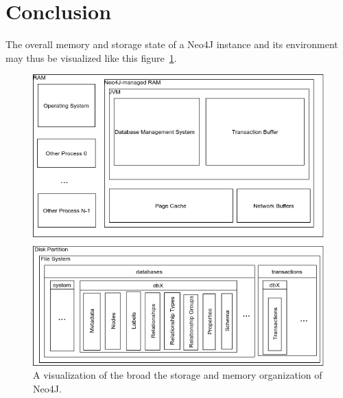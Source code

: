 \documentclass[a4paper,10pt]{article}
\begin{document}
\section{Conclusion}
The overall memory and storage state of a Neo4J instance and its environment may thus be visualized like this figure~\ref{N4J_memory_view}.

\begin{figure}[htp]\label{N4J_memory_view}
 \begin{center}
  \includegraphics[keepaspectratio,width=\textwidth]{img/N4J_memory_view.png}
 \end{center}
 \caption{A visualization of the broad the storage and memory organization of Neo4J.} %
\end{figure}
\end{document}
